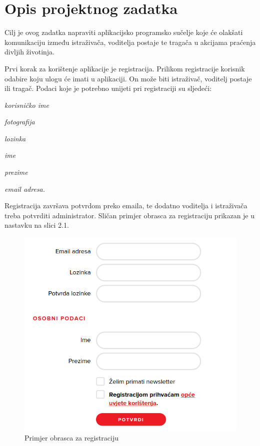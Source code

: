 \chapter{Opis projektnog zadatka}
		
		
		Cilj je ovog zadatka napraviti aplikacijsko programsko sučelje koje će olakšati komunikaciju između istraživača, voditelja postaje te tragača u akcijama praćenja divljih životinja.
		
		Prvi korak za korištenje aplikacije je registracija. Prilikom registracije korisnik odabire koju ulogu će imati u aplikaciji. On može biti istraživač, voditelj postaje ili tragač.
		Podaci koje je potrebno unijeti pri registraciji su sljedeći:
		\begin{packed_item}
			\item \textit{korisničko ime}
			\item \textit{fotografija}
			\item \textit{lozinka}
			\item \textit{ime}
			\item \textit{prezime}
			\item \textit{email adresa.}
		\end{packed_item}
		
		Registracija završava potvrdom preko emaila, te dodatno voditelja i istraživača treba potvrditi administrator. Sličan primjer obrasca za registraciju prikazan je u nastavku na slici 2.1.
		
		\begin{figure}[H]
			\includegraphics[scale=0.75]{slike/probrazac.PNG} %
			\centering
			\caption{Primjer obrasca za registraciju}
			\label{fig:probrasca} %
		\end{figure}
		
